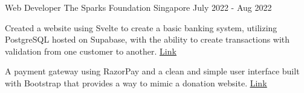 \begin{cventries}
    
    \cventry
    {Web Developer} %
    {The Sparks Foundation} %
    {Singapore} %
    {July 2022 - Aug 2022} %
    {
      \begin{cvitems} %
        \item {Created a website using Svelte to create a basic banking system, utilizing PostgreSQL hosted on Supabase, with the ability to create transactions with validation from one customer to another. \textcolor{link}{\underline{\href{https://tsf-intern.vercel.app/}{Link}}}}
        \item {A payment gateway using RazorPay and a clean and simple user interface built with Bootstrap that provides a way to mimic a donation website. \textcolor{link}{\underline{\href{https://tsf-intern2.vercel.app}{Link}}}}
      \end{cvitems}
    }
    
   

    
   
\end{cventries}
